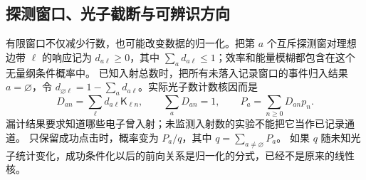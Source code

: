 \subsection{探测窗口、光子截断与可辨识方向}

有限窗口不仅减少行数，也可能改变数据的归一化。把第 $a$ 个互斥探测窗对理想边带 $\ell$ 的响应记为
$d_{a\ell}\ge0$，其中 $\sum_a d_{a\ell}\le1$；效率和能量模糊都包含在这个无量纲条件概率中。
已知入射总数时，把所有未落入记录窗口的事件归入结果 $a=\varnothing$，令
$d_{\varnothing\ell}=1-\sum_a d_{a\ell}$。实际光子数计数核因而是
\begin{equation}
 D_{an}=\sum_\ell d_{a\ell}\mathsf K_{\ell n},\qquad
 \sum_aD_{an}=1,\qquad P_a=\sum_{n\ge0}D_{an}p_n.
 \label{eq:feqo-complete-count-kernel}
\end{equation}
漏计结果要求知道哪些电子曾入射；未监测入射数的实验不能把它当作已记录通道。
只保留成功点击时，概率变为 $P_a/q$，其中 $q=\sum_{a\ne\varnothing}P_a$。
如果 $q$ 随未知光子统计变化，成功条件化以后的前向关系是归一化的分式，已经不是原来的线性核。

